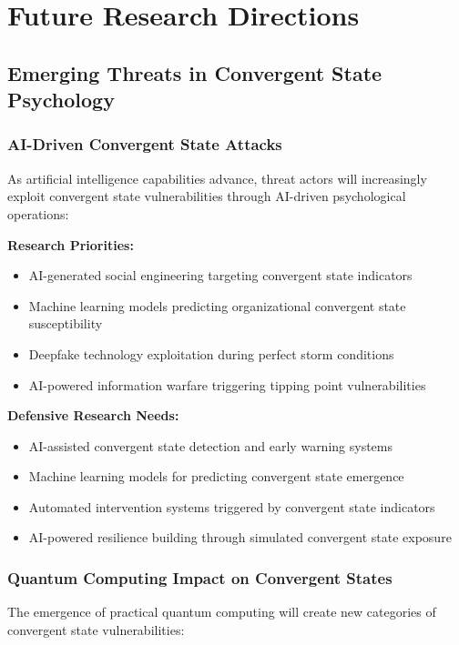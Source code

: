 \documentclass[11pt,a4paper]{article}
\begin{document}
\section{Future Research Directions}

\subsection{Emerging Threats in Convergent State Psychology}

\subsubsection{AI-Driven Convergent State Attacks}

As artificial intelligence capabilities advance, threat actors will increasingly exploit convergent state vulnerabilities through AI-driven psychological operations:

\textbf{Research Priorities:}
\begin{itemize}
\item AI-generated social engineering targeting convergent state indicators
\item Machine learning models predicting organizational convergent state susceptibility
\item Deepfake technology exploitation during perfect storm conditions
\item AI-powered information warfare triggering tipping point vulnerabilities
\end{itemize}

\textbf{Defensive Research Needs:}
\begin{itemize}
\item AI-assisted convergent state detection and early warning systems
\item Machine learning models for predicting convergent state emergence
\item Automated intervention systems triggered by convergent state indicators
\item AI-powered resilience building through simulated convergent state exposure
\end{itemize}

\subsubsection{Quantum Computing Impact on Convergent States}

The emergence of practical quantum computing will create new categories of convergent state vulnerabilities:
\end{document}
